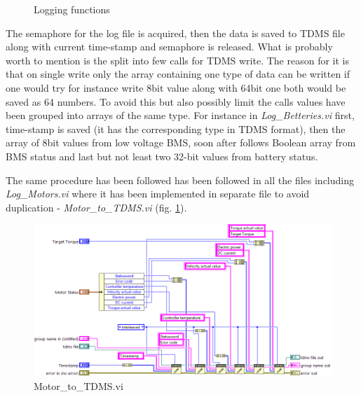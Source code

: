 \begin{figure}[h]\ContinuedFloat
    \centering
    \renewcommand{\thesubfigure}{}%
    \tightsubcaptions %
    \setlength{\subfloatlabelskip}{0pt}%
    \caption{Logging functions}
\end{figure}
The semaphore for the log file is acquired, then the data is saved to TDMS file along with current time-stamp and semaphore is released. What is probably worth to mention is the split into few calls for TDMS write. The reason for it is that on single write only the array containing one type of data can be written if one would try for instance write 8bit value along with 64bit one both would be saved as 64 numbers. To avoid this but also possibly limit the calls values have been grouped into arrays of the same type. For instance in \textit{Log\_Betteries.vi} first, time-stamp is saved (it has the corresponding type in TDMS format), then the array of 8bit values from low voltage BMS, soon after follows Boolean array from BMS status and last but not least two 32-bit values from battery status.

The same procedure has been followed has been followed in all the files including \textit{Log\_Motors.vi} where it has been implemented in separate file to avoid duplication - \textit{Motor\_to\_TDMS.vi} (fig. \ref{vi:Motor_to_TDMS}).
\begin{figure}[H]
    \centering
    \includegraphics[scale=\visc,max width=\textwidth]{figures/Motor_to_TDMSd}
    \caption{Motor\_to\_TDMS.vi}
    \label{vi:Motor_to_TDMS}
\end{figure}

